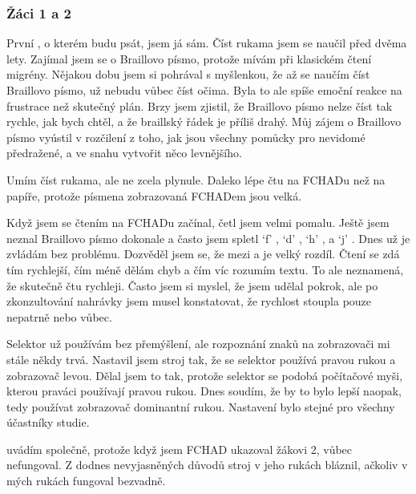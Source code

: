 \subsubsection{Žáci 1 a 2}

První , o kterém budu psát, jsem já sám.  Číst rukama jsem se naučil před dvěma lety. Zajímal jsem se o Braillovo písmo, protože mívám při klasickém čtení migrény.  Nějakou dobu jsem si pohrával s myšlenkou, že až se naučím číst Braillovo písmo, už nebudu vůbec číst očima.  Byla to ale spíše emoční reakce na frustrace než skutečný plán.  Brzy jsem zjistil, že Braillovo písmo nelze číst tak rychle, jak bych chtěl, a že braillský řádek je příliš drahý.  Můj zájem o Braillovo písmo vyústil v rozčilení z toho, jak jsou všechny pomůcky pro nevidomé předražené, a ve snahu vytvořit něco levnějšího.

Umím číst rukama, ale ne zcela plynule.  Daleko lépe čtu na FCHADu než na papíře, protože písmena zobrazovaná FCHADem jsou velká.

Když jsem se čtením na FCHADu začínal, četl jsem velmi pomalu.  Ještě jsem neznal Braillovo písmo dokonale a často jsem spletl `f' , `d' , `h' , a `j' . Dnes už je zvládám bez problému.  Dozvěděl jsem se, že mezi  a  je velký rozdíl.  Čtení se zdá tím rychlejší, čím méně dělám chyb a čím víc rozumím textu. To ale neznamená, že skutečně čtu rychleji. Často jsem si myslel, že jsem udělal pokrok, ale po zkonzultování nahrávky jsem musel konstatovat, že rychlost stoupla pouze nepatrně nebo vůbec.

Selektor už používám bez přemýšlení, ale rozpoznání znaků na zobrazovači mi stále někdy trvá.  Nastavil jsem stroj tak, že se selektor používá pravou rukou a zobrazovač levou. Dělal jsem to tak, protože selektor se podobá počítačové myši, kterou praváci používají pravou rukou.  Dnes soudím, že by to bylo lepší naopak, tedy používat zobrazovač dominantní rukou.  Nastavení bylo stejné pro všechny účastníky studie.

 uvádím společně, protože když jsem FCHAD ukazoval žákovi 2, vůbec nefungoval. Z dodnes nevyjasněných důvodů stroj v jeho rukách bláznil, ačkoliv v mých rukách fungoval bezvadně.




